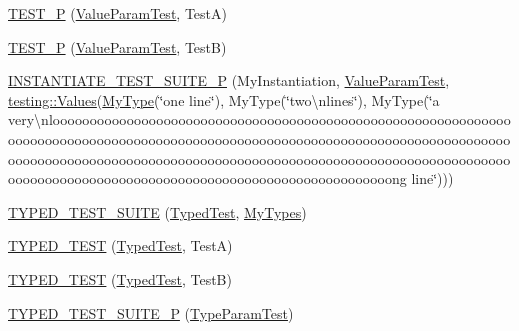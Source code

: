 \begin{DoxyCompactItemize}
\item 
\mbox{\hyperlink{googletest-master_2googletest_2test_2googletest-list-tests-unittest___8cc_adc97fba291db78177b4e5bdf6f6d9018}{T\+E\+S\+T\+\_\+P}} (\mbox{\hyperlink{class_value_param_test}{Value\+Param\+Test}}, TestA)
\item 
\mbox{\hyperlink{googletest-master_2googletest_2test_2googletest-list-tests-unittest___8cc_aa743157309ca6126251b87f7436205a1}{T\+E\+S\+T\+\_\+P}} (\mbox{\hyperlink{class_value_param_test}{Value\+Param\+Test}}, TestB)
\item 
\mbox{\hyperlink{googletest-master_2googletest_2test_2googletest-list-tests-unittest___8cc_ac2b79a5b6af77ea7410b124b0904ddd4}{I\+N\+S\+T\+A\+N\+T\+I\+A\+T\+E\+\_\+\+T\+E\+S\+T\+\_\+\+S\+U\+I\+T\+E\+\_\+P}} (My\+Instantiation, \mbox{\hyperlink{class_value_param_test}{Value\+Param\+Test}}, \mbox{\hyperlink{namespacetesting_abd3c87b40c2a0663691c9b617ed5fcc2}{testing\+::\+Values}}(\mbox{\hyperlink{class_my_type}{My\+Type}}(\char`\"{}one line\char`\"{}), My\+Type(\char`\"{}two\textbackslash{}nlines\char`\"{}), My\+Type(\char`\"{}a very\textbackslash{}nloooooooooooooooooooooooooooooooooooooooooooooooooooooooooooooooooooooooooooooooooooooooooooooooooooooooooooooooooooooooooooooooooooooooooooooooooooooooooooooooooooooooooooooooooooooooooooooooooooooooooooooooooooooooooooooooooooooooooooooooooooooooooong line\char`\"{})))
\item 
\mbox{\hyperlink{googletest-master_2googletest_2test_2googletest-list-tests-unittest___8cc_a346de8e681bc95011fed254a54e30205}{T\+Y\+P\+E\+D\+\_\+\+T\+E\+S\+T\+\_\+\+S\+U\+I\+TE}} (\mbox{\hyperlink{class_typed_test}{Typed\+Test}}, \mbox{\hyperlink{googletest-master_2googletest_2test_2googletest-list-tests-unittest___8cc_a16f58cd49c18568802322bbaf9f3f654}{My\+Types}})
\item 
\mbox{\hyperlink{googletest-master_2googletest_2test_2googletest-list-tests-unittest___8cc_a83ec84c5fac9fdffa59a16e5d043bd66}{T\+Y\+P\+E\+D\+\_\+\+T\+E\+ST}} (\mbox{\hyperlink{class_typed_test}{Typed\+Test}}, TestA)
\item 
\mbox{\hyperlink{googletest-master_2googletest_2test_2googletest-list-tests-unittest___8cc_a1ac7e35f3d659458b18cc29d71ed1f46}{T\+Y\+P\+E\+D\+\_\+\+T\+E\+ST}} (\mbox{\hyperlink{class_typed_test}{Typed\+Test}}, TestB)
\item 
\mbox{\hyperlink{googletest-master_2googletest_2test_2googletest-list-tests-unittest___8cc_a8ee0021cbd9bdfcb7c02ce2607805dfc}{T\+Y\+P\+E\+D\+\_\+\+T\+E\+S\+T\+\_\+\+S\+U\+I\+T\+E\+\_\+P}} (\mbox{\hyperlink{class_type_param_test}{Type\+Param\+Test}})

\end{DoxyCompactItemize}
